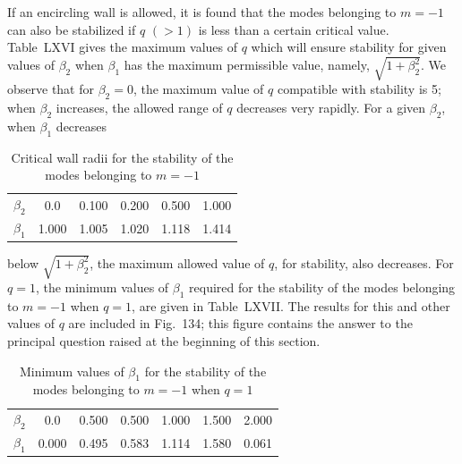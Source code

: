 If an encircling wall is allowed, it is found that the modes belonging to $m = -1$ can also be stabilized if $q$ $(> 1)$ is less than a certain critical value. Table~LXVI gives the maximum values of $q$ which will ensure stability for given values of $\beta_2$ when $\beta_1$ has the maximum permissible value, namely, $\sqrt{1+\beta_2^2}$. We observe that for $\beta_2 = 0$, the maximum value of $q$ compatible with stability is 5; when $\beta_2$ increases, the allowed range of $q$ decreases very rapidly. For a given $\beta_2$, when $\beta_1$ decreases

\begin{table}[ht]
\centering
\caption{Critical wall radii for the stability of the modes belonging to $m = -1$}
\label{tab:LXVI}
\begin{tabular}{cccccc}
\hline
$\beta_2$ & 0.0 & 0.100 & 0.200 & 0.500 & 1.000 \\
$\beta_1$ & 1.000 & 1.005 & 1.020 & 1.118 & 1.414 \\
\hline
\end{tabular}
\end{table}

below $\sqrt{1+\beta_2^2}$, the maximum allowed value of $q$, for stability, also decreases. For $q = 1$, the minimum values of $\beta_1$ required for the stability of the modes belonging to $m = -1$ when $q = 1$, are given in Table~LXVII. The results for this and other values of $q$ are included in Fig.~134; this figure contains the answer to the principal question raised at the beginning of this section.

\begin{table}[ht]
\centering
\caption{Minimum values of $\beta_1$ for the stability of the modes belonging to $m = -1$ when $q = 1$}
\label{tab:LXVII}
\begin{tabular}{ccccccc}
\hline
$\beta_2$ & 0.0 & 0.500 & 0.500 & 1.000 & 1.500 & 2.000 \\
$\beta_1$ & 0.000 & 0.495 & 0.583 & 1.114 & 1.580 & 0.061 \\
\hline
\end{tabular}
\end{table}


